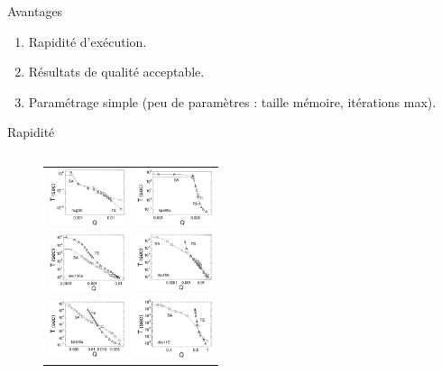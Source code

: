 \documentclass[10pt, handout]{beamer}
\begin{document}
\begin{frame}{Avantages}
    \begin{enumerate}
        \item Rapidité d'exécution.
        \item Résultats de qualité acceptable.
        \item Paramétrage simple (peu de paramètres : taille mémoire, itérations max).
    \end{enumerate}
\end{frame}

\begin{frame}{Rapidité}
    \begin{columns}
        \begin{column}{0.6\textwidth}
            \begin{figure}[ht]
                \begin{center}
                    \begin{tabular}{cc}
                        \includegraphics[width=2.2cm]{figures/pnug30Ro.eps}   &
                        \includegraphics[width=2.2cm]{figures/plipa90aRo.eps}   \\
                        \includegraphics[width=2.2cm]{figures/psko100aRo.eps} &
                        \includegraphics[width=2.2cm]{figures/ptho150Ro.eps}    \\
                        \includegraphics[width=2.2cm]{figures/ptai100aRo.eps} &
                        \includegraphics[width=2.2cm]{figures/pdre110Ro.eps}

\end{tabular}
\end{center}
\end{figure}
\end{column}
\end{columns}
\end{frame}
\end{document}
